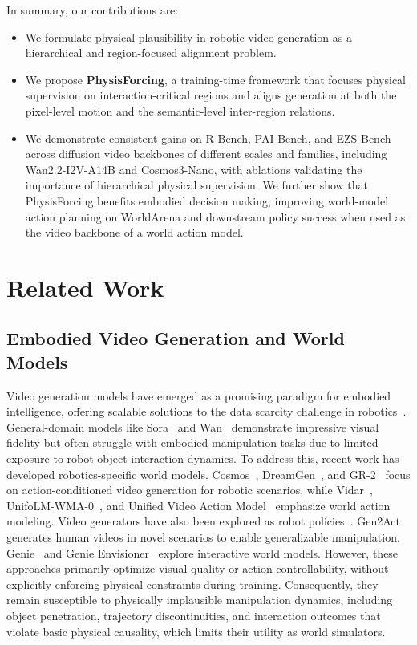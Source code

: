 \documentclass{llmxive}
\begin{document}
In summary, our contributions are:
\begin{itemize}
    \item We formulate physical plausibility in robotic video generation as a hierarchical and region-focused alignment problem.
    \item We propose \textbf{PhysisForcing}, a training-time framework that focuses physical supervision on interaction-critical regions and aligns generation at both the pixel-level motion and the semantic-level inter-region relations.
    
    \item We demonstrate consistent gains on R-Bench, PAI-Bench, and EZS-Bench across diffusion video backbones of different scales and families, including Wan2.2-I2V-A14B and Cosmos3-Nano, with ablations validating the importance of hierarchical physical supervision. We further show that PhysisForcing benefits embodied decision making, improving world-model action planning on WorldArena and downstream policy success when used as the video backbone of a world action model.
\end{itemize}
\section{Related Work}

\subsection{Embodied Video Generation and World Models}

Video generation models have emerged as a promising paradigm for embodied intelligence, offering scalable solutions to the data scarcity challenge in robotics~\cite{openai2024sora,wan2025wan,kong2024hunyuanvideo,yang2024cogvideox,GoogleDeepMind2025Veo3}. General-domain models like Sora~\cite{openai2024sora} and Wan~\cite{wan2025wan} demonstrate impressive visual fidelity but often struggle with embodied manipulation tasks due to limited exposure to robot-object interaction dynamics. To address this, recent work has developed robotics-specific world models. Cosmos~\cite{nvidia2026worldsimulationvideofoundation}, DreamGen~\cite{jang2025dreamgen}, and GR-2~\cite{cheang2024gr} focus on action-conditioned video generation for robotic scenarios, while Vidar~\cite{feng2025vidar}, UnifoLM-WMA-0~\cite{unifolm-wma-0}, and Unified Video Action Model~\cite{li2025unified} emphasize world action modeling. Video generators have also been explored as robot policies~\cite{liang2025video,hu2024video}. Gen2Act~\cite{bharadhwaj2024gen2act} generates human videos in novel scenarios to enable generalizable manipulation. Genie~\cite{bruce2024genie} and Genie Envisioner~\cite{liao2025genie} explore interactive world models. However, these approaches primarily optimize visual quality or action controllability, without explicitly enforcing physical constraints during training. Consequently, they remain susceptible to physically implausible manipulation dynamics, including object penetration, trajectory discontinuities, and interaction outcomes that violate basic physical causality, which limits their utility as world simulators.
\end{document}
